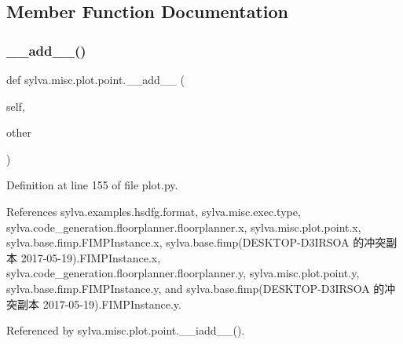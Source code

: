 \subsection{Member Function Documentation}
\mbox{\label{classsylva_1_1misc_1_1plot_1_1point_abd550240b0bf5fb6fca1d4a2c9bd9db2}} 
\subsubsection{\texorpdfstring{\+\_\+\+\_\+add\+\_\+\+\_\+()}{\_\_add\_\_()}}
{\footnotesize\ttfamily def sylva.\+misc.\+plot.\+point.\+\_\+\+\_\+add\+\_\+\+\_\+ (\begin{DoxyParamCaption}\item[{}]{self,  }\item[{}]{other }\end{DoxyParamCaption})}



Definition at line 155 of file plot.\+py.



References sylva.\+examples.\+hsdfg.\+format, sylva.\+misc.\+exec.\+type, sylva.\+code\+\_\+generation.\+floorplanner.\+floorplanner.\+x, sylva.\+misc.\+plot.\+point.\+x, sylva.\+base.\+fimp.\+F\+I\+M\+P\+Instance.\+x, sylva.\+base.\+fimp(\+D\+E\+S\+K\+T\+O\+P-\/\+D3\+I\+R\+S\+O\+A 的冲突副本 2017-\/05-\/19).\+F\+I\+M\+P\+Instance.\+x, sylva.\+code\+\_\+generation.\+floorplanner.\+floorplanner.\+y, sylva.\+misc.\+plot.\+point.\+y, sylva.\+base.\+fimp.\+F\+I\+M\+P\+Instance.\+y, and sylva.\+base.\+fimp(\+D\+E\+S\+K\+T\+O\+P-\/\+D3\+I\+R\+S\+O\+A 的冲突副本 2017-\/05-\/19).\+F\+I\+M\+P\+Instance.\+y.



Referenced by sylva.\+misc.\+plot.\+point.\+\_\+\+\_\+iadd\+\_\+\+\_\+().


